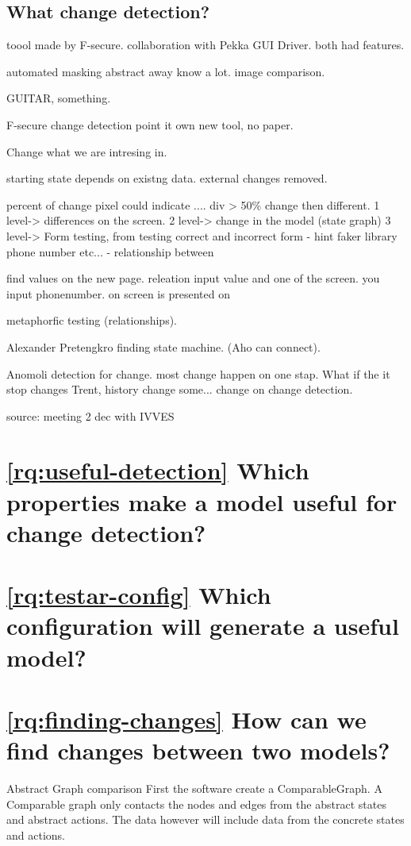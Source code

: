 \subsection{What change detection?}

toool made by F-secure. collaboration with Pekka GUI Driver. both had features. 

automated masking abstract away know a lot. image comparison. 

GUITAR, something. 

F-secure change detection point it own 
new tool, no paper. 

Change what we are intresing in.

starting state depends on existng data. external changes removed. 

percent of change pixel could indicate .... div > 50\% change then different. 
1 level-> differences on the screen.
2 level-> change in the model (state graph)
3 level-> Form testing, from testing correct and incorrect form
 - hint faker library phone number etc...
 - relationship between 

find values on the new page. releation input value and one of the screen. you input phonenumber. on screen is presented on

metaphorfic testing (relationships). 

Alexander Pretengkro finding state machine. (Aho can connect).

Anomoli detection for change. most change happen on one stap. What if the it stop changes Trent, history change some... change on change detection. 
 
 source: meeting 2 dec with IVVES 
 
\section{\ref{rq:useful-detection} Which properties make a model useful for change detection?}
\section{\ref{rq:testar-config} Which \testar configuration will generate a useful model?}
\section{\ref{rq:finding-changes} How can we find changes between two models?}

Abstract Graph comparison
First the software create a ComparableGraph. A Comparable graph only contacts the nodes and edges from the abstract states and abstract actions. The data however will include data from the concrete states and actions. 

